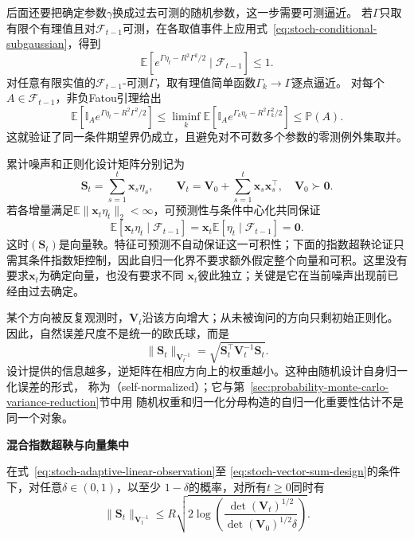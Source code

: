 后面还要把确定参数\(\gamma\)换成过去可测的随机参数，这一步需要可测逼近。
若\(\Gamma\)只取有限个有理值且对\(\mathcal F_{t-1}\)可测，在各取值事件上应用式~\eqref{eq:stoch-conditional-subgaussian}，得到
\[
 \mathbb E\!\left[
 e^{\Gamma\eta_t-R^2\Gamma^2/2}\mid\mathcal F_{t-1}
 \right]\leq1.
\]
对任意有限实值的\(\mathcal F_{t-1}\)-可测\(\Gamma\)，取有理值简单函数\(\Gamma_k\to\Gamma\)逐点逼近。
对每个\(A\in\mathcal F_{t-1}\)，非负Fatou引理给出
\[
 \mathbb E[\mathbb I_A e^{\Gamma\eta_t-R^2\Gamma^2/2}]
 \leq\liminf_k
 \mathbb E[\mathbb I_A e^{\Gamma_k\eta_t-R^2\Gamma_k^2/2}]
 \leq\mathbb P(A).
\]
这就验证了同一条件期望界仍成立，且避免对不可数多个参数的零测例外集取并。

累计噪声和正则化设计矩阵分别记为
\begin{equation}
  \bm{S}_t=\sum_{s=1}^{t}\bm{x}_s\eta_s,
  \qquad
  \bm{V}_t=\bm{V}_0+\sum_{s=1}^{t}\bm{x}_s\bm{x}_s^{\top},
  \quad\bm{V}_0\succ\bm{0}.
  \label{eq:stoch-vector-sum-design}
\end{equation}
若各增量满足\(\mathbb E\lVert\bm x_t\eta_t\rVert_2<\infty\)，可预测性与条件中心化共同保证
\[
  \mathbb{E}[\bm{x}_t\eta_t\mid\mathcal{F}_{t-1}]
  =
  \bm{x}_t
  \mathbb{E}[\eta_t\mid\mathcal{F}_{t-1}]
  =\bm{0}.
\]
这时$(\bm{S}_t)$是向量鞅。特征可预测不自动保证这一可积性；下面的指数超鞅论证只需其条件指数矩控制，因此自归一化界不要求额外假定整个向量和可积。这里没有要求$\bm{x}_t$为确定向量，也没有要求不同
$\bm{x}_t$彼此独立；关键是它在当前噪声出现前已经由过去确定。

某个方向被反复观测时，$\bm{V}_t$沿该方向增大；从未被询问的方向只剩初始正则化。
因此，自然误差尺度不是统一的欧氏球，而是
\[
  \lVert\bm{S}_t\rVert_{\bm{V}_t^{-1}}
  =\sqrt{\bm{S}_t^{\top}\bm{V}_t^{-1}\bm{S}_t}.
\]
设计提供的信息越多，逆矩阵在相应方向上的权重越小。这种由随机设计自身归一化误差的形式，
称为（self-normalized）；它与第~\ref{sec:probability-monte-carlo-variance-reduction}节中用
随机权重和归一化分母构造的自归一化重要性估计不是同一个对象。

\par\medskip\noindent\textbf{混合指数超鞅与向量集中}\quad
\begin{theorem}[向量自归一化集中界]
  \label{thm:stoch-vector-self-normalized}
  在式~\eqref{eq:stoch-adaptive-linear-observation}至
  \eqref{eq:stoch-vector-sum-design}的条件下，对任意$\delta\in(0,1)$，以至少
  $1-\delta$的概率，对所有$t\geq0$同时有
  \begin{equation}
    \lVert\bm{S}_t\rVert_{\bm{V}_t^{-1}}
    \leq
    R\sqrt{
      2\log\left(
        \frac{\det(\bm{V}_t)^{1/2}}
             {\det(\bm{V}_0)^{1/2}\delta}
      \right)
    }.
    \label{eq:stoch-vector-self-normalized-bound}
  \end{equation}
\end{theorem}

